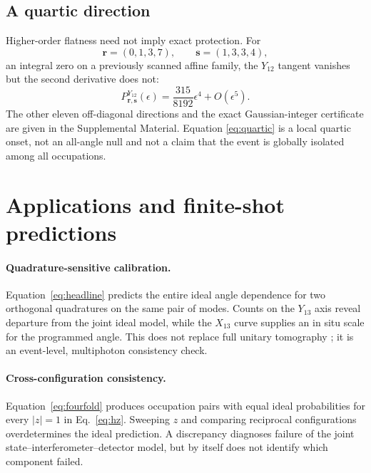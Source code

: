 \documentclass[aps,pra,reprint,amsmath,amssymb,superscriptaddress,longbibliography]{revtex4-2}
\begin{document}
\subsection{A quartic direction}

Higher-order flatness need not imply exact protection.  For
\begin{equation}
\bm r=(0,1,3,7),\qquad \bm s=(1,3,3,4),
\end{equation}
an integral zero on a previously scanned affine family, the $Y_{12}$
tangent vanishes but the second derivative does not:
\begin{equation}
P^{Y_{12}}_{\bm r,\bm s}(\epsilon)
=\frac{315}{8192}\epsilon^4+O(\epsilon^5).
\label{eq:quartic}
\end{equation}
The other eleven off-diagonal directions and the exact Gaussian-integer
certificate are given in the Supplemental Material.  Equation
\eqref{eq:quartic} is a local quartic onset, not an all-angle null and not a
claim that the event is globally isolated among all occupations.

\section{Applications and finite-shot predictions}
\label{sec:applications}

\paragraph*{Quadrature-sensitive calibration.}
Equation~\eqref{eq:headline} predicts the entire ideal angle dependence for
two orthogonal quadratures on the same pair of modes.  Counts on the
$Y_{13}$ axis reveal departure from the joint ideal model, while the
$X_{13}$ curve supplies an in situ scale for the programmed angle.  This
does not replace full unitary tomography \cite{RahimiKeshari2013}; it is an
event-level, multiphoton consistency check.

\paragraph*{Cross-configuration consistency.}
Equation~\eqref{eq:fourfold} produces occupation pairs with equal ideal
probabilities for every $|z|=1$ in Eq.~\eqref{eq:hz}.  Sweeping $z$ and
comparing reciprocal configurations overdetermines the ideal prediction.
A discrepancy diagnoses failure of the joint state--interferometer--detector
model, but by itself does not identify which component failed.
\end{document}
